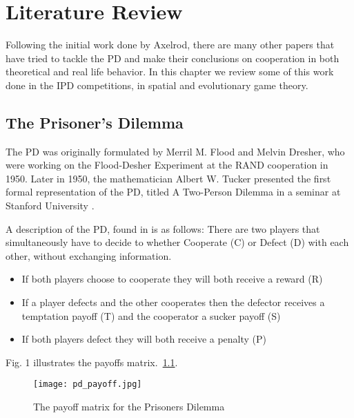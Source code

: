 \chapter{Literature Review}

Following the initial work done by Axelrod, there are many other papers that
have tried to tackle the PD and make their conclusions on cooperation in
both theoretical and real life behavior. In this chapter we review some of this
work done in the IPD competitions, in spatial and evolutionary game theory.

\section{The Prisoner's Dilemma}
The PD was originally formulated by Merril M. Flood and Melvin Dresher,
who were working on the Flood-Desher Experiment at the RAND cooperation in 1950.
Later in 1950, the mathematician Albert W. Tucker presented the first formal
representation of the PD, titled  A Two-Person Dilemma in a seminar at
Stanford University \parencite{Gass005}.

A description of the PD, found in \parencite{Li2011} is as follows:
There are two players that simultaneously have to decide to whether Cooperate (C)
or Defect (D) with each other, without exchanging information.

\begin{itemize}
  \item If both players choose to cooperate they will both receive a reward (R)
  \item If a player defects and the other cooperates then the defector receives
  a temptation payoff (T) and the cooperator a sucker payoff (S)
  \item If both players defect they will both receive a penalty (P)
\end{itemize}


Fig. 1 illustrates the payoffs matrix.~\ref{fig:pd_payoff}.

\begin{figure}[h!]
\centering
\texttt{[image: pd\_payoff.jpg]}
\caption{The payoff matrix for the Prisoners Dilemma \parencite{Li2011}}
\label{fig:pd_payoff}
\end{figure}

